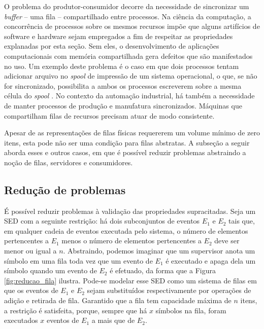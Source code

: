 O problema do produtor-consumidor decorre da necessidade de sincronizar um \textit{buffer} -- uma fila -- compartilhado entre processos. Na ciência da computação, a concorrência de processos sobre os mesmos recursos impõe que alguns artifícios de software e hardware sejam empregados a fim de respeitar as propriedades explanadas por esta seção. Sem eles, o desenvolvimento de aplicações computacionais com memória compartilhada gera defeitos que são manifestados no uso. Um exemplo deste problema é o caso em que dois processos tentam adicionar arquivo no \textit{spool} de impressão de um sistema operacional, o que, se não for sincronizado, possibilita a ambos os processos escreverem sobre a mesma célula do \textit{spool} \cite{tanenbaum}. No contexto da automação industrial, há também a necessidade de manter processos de produção e manufatura sincronizados. Máquinas que compartilham filas de recursos precisam atuar de modo consistente. 

Apesar de as representações de filas físicas requererem um volume mínimo de zero itens, esta pode não ser uma condição para filas abstratas. A subseção a seguir aborda esses e outros casos, em que é possível reduzir problemas abstraindo a noção de filas, servidores e consumidores.

\subsection{Redução de problemas}

É possível reduzir problemas à validação das propriedades supracitadas. Seja um SED com a seguinte restrição: há dois subconjuntos de eventos $E_1$ e $E_2$ tais que, em qualquer cadeia de eventos executada pelo sistema, o número de elementos pertencentes a $E_1$ menos o número de elementos pertencentes a $E_2$ deve ser menor ou igual a $n$. Abstraindo, podemos imaginar que um supervisor anota um símbolo em uma fila toda vez que um evento de $E_1$ é executado e apaga dela um símbolo quando um evento de $E_2$ é efetuado, da forma que a Figura \ref{fig:reducao_fila} ilustra. Pode-se modelar esse SED como um sistema de filas em que os eventos de $E_1$ e $E_2$ sejam substituídos respectivamente por operações de adição e retirada de fila. Garantido que a fila tem capacidade máxima de $n$ itens, a restrição é satisfeita, porque, sempre que há $x$ símbolos na fila, foram executados $x$ eventos de $E_1$ a mais que de $E_2$.


